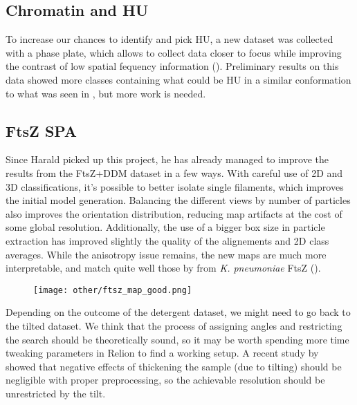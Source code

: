 \subsection{Chromatin and HU}\label{future_hu}

To increase our chances to identify and pick HU, a new dataset was collected with a phase plate, which allows to collect data closer to focus while improving the contrast of low spatial fequency information ().
Preliminary results on this data showed more classes containing what could be HU in a similar conformation to what was seen in , but more work is needed.


\subsection{FtsZ SPA}\label{future_ftsz_spa}

Since Harald picked up this project, he has already managed to improve the results from the FtsZ+DDM dataset in a few ways.
With careful use of 2D and 3D classifications, it's possible to better isolate single filaments, which improves the initial model generation.
Balancing the different views by number of particles also improves the orientation distribution, reducing map artifacts at the cost of some global resolution.
Additionally, the use of a bigger box size in particle extraction has improved slightly the quality of the alignements and 2D class averages.
While the anisotropy issue remains, the new maps are much more interpretable, and match quite well those by \citet{fujitaStructuresFtsZSingle2023} from \textit{K. pneumoniae} FtsZ ().

\begin{figure}
    \centering
    \texttt{[image: other/ftsz\_map\_good.png]}
    \label{fig:ftsz_hari_map}
\end{figure}

Depending on the outcome of the detergent dataset, we might need to go back to the tilted dataset.
We think that the process of assigning angles and restricting the search should be theoretically sound, so it may be worth spending more time tweaking parameters in Relion to find a working setup.
A recent study by ~\citet{aiyerOvercomingResolutionAttenuation2024} showed that negative effects of thickening the sample (due to tilting) should be negligible with proper preprocessing, so the achievable resolution should be unrestricted by the tilt.

